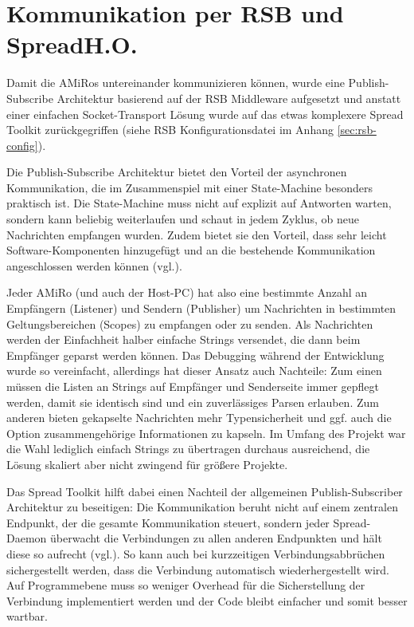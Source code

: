 \vfill

\section[Kommunikation per RSB und Spread]{Kommunikation per RSB und Spread\hfill {\normalsize H.O.}}
Damit die AMiRos untereinander kommunizieren können, wurde eine Publish-Subscribe Architektur basierend auf der RSB Middleware aufgesetzt und anstatt einer einfachen Socket-Transport Lösung wurde auf das etwas komplexere Spread Toolkit zurückgegriffen (siehe RSB Konfigurationsdatei im Anhang \ref{sec:rsb-config}).

Die Publish-Subscribe Architektur bietet den Vorteil der asynchronen Kommunikation, die im Zusammenspiel mit einer State-Machine besonders praktisch ist. Die State-Machine muss nicht auf explizit auf Antworten warten, sondern kann beliebig weiterlaufen und schaut in jedem Zyklus, ob neue Nachrichten empfangen wurden. Zudem bietet sie den Vorteil, dass sehr leicht Software-Komponenten hinzugefügt und an die bestehende Kommunikation angeschlossen werden können (vgl.\cite{Siciliano:2007}).

Jeder AMiRo (und auch der Host-PC) hat also eine bestimmte Anzahl an Empfängern (Listener) und Sendern (Publisher) um Nachrichten in bestimmten Geltungsbereichen (Scopes) zu empfangen oder zu senden. Als Nachrichten werden der Einfachheit halber einfache Strings versendet, die dann beim Empfänger geparst werden können. Das Debugging während der Entwicklung wurde so vereinfacht, allerdings hat dieser Ansatz auch Nachteile: Zum einen müssen die Listen an Strings auf Empfänger und Senderseite immer gepflegt werden, damit sie identisch sind und ein zuverlässiges Parsen erlauben. Zum anderen bieten gekapselte Nachrichten mehr Typensicherheit und ggf. auch die Option zusammengehörige Informationen zu kapseln. Im Umfang des Projekt war die Wahl lediglich einfach Strings zu übertragen durchaus ausreichend, die Lösung skaliert aber nicht zwingend für größere Projekte.

Das Spread Toolkit hilft dabei einen Nachteil der allgemeinen Publish-Subscriber Architektur zu beseitigen: Die Kommunikation beruht nicht auf einem zentralen Endpunkt, der die gesamte Kommunikation steuert, sondern jeder Spread-Daemon überwacht die Verbindungen zu allen anderen Endpunkten und hält diese so aufrecht (vgl.\cite{Siciliano:2007}). So kann auch bei kurzzeitigen Verbindungsabbrüchen sichergestellt werden, dass die Verbindung automatisch wiederhergestellt wird. Auf Programmebene  muss so weniger Overhead für die Sicherstellung der Verbindung implementiert werden und der Code bleibt einfacher und somit besser wartbar.

